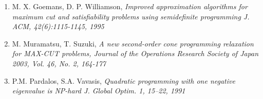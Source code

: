 \documentclass[12pt]{book}
\theoremstyle{definition}
\begin{document}
\begin{enumerate}


\item M. X. Goemans, D. P. Williamson, \it Improved approximation algorithms for maximum cut and satisfiability problems using semidefinite programming \rm J. ACM, 42(6):1115-1145, 1995
\label{GoemansWilliamsonMaxCut}
%
\item M. Muramatsu,  T. Suzuki, \it A new second-order cone programming relaxation for MAX-CUT problems, \rm Journal of the Operations Research
Society of Japan 2003, Vol. 46, No. 2, 164-177
\label{MuramatsuSuzukiANewSOCPrelaxForMaxCut}
%









\item P.M. Pardalos, S.A. Vavasis, \it Quadratic programming with one negative eigenvalue is NP-hard \rm J. Global Optim. 1, 15–22, 1991
\label{PardalosQPisNPHard}

\end{enumerate}
\end{document}
